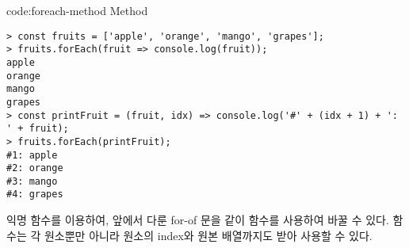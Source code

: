 \begin{codeenv}{code:foreach-method}{ Method}\begin{verbatim}
> const fruits = ['apple', 'orange', 'mango', 'grapes'];
> fruits.forEach(fruit => console.log(fruit));
apple
orange
mango
grapes
> const printFruit = (fruit, idx) => console.log('#' + (idx + 1) + ': ' + fruit);
> fruits.forEach(printFruit);
#1: apple
#2: orange
#3: mango
#4: grapes
\end{verbatim}
\end{codeenv}

익명 함수를 이용하여, 앞에서 다룬 for-of 문을 \와 같이  함수를 사용하여 바꿀 수 있다.  함수는 각 원소뿐만 아니라 원소의 index와 원본 배열까지도 받아 사용할 수 있다.

